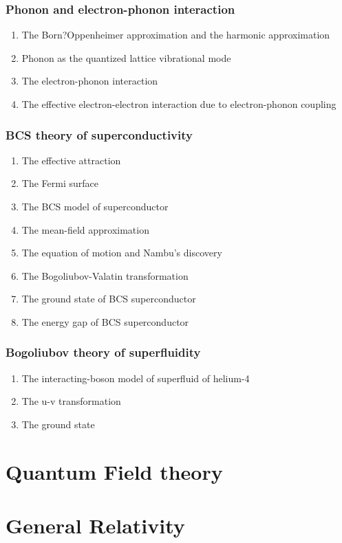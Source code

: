\documentclass[12pt]{article}
\numberwithin{equation}{section}
\begin{document}
\subsubsection{Phonon and electron-phonon interaction}
\begin{enumerate}
\item The Born?Oppenheimer approximation and the harmonic approximation
\item Phonon as the quantized lattice vibrational mode
\item The electron-phonon interaction
\item The effective electron-electron interaction due to electron-phonon coupling
\end{enumerate}
\subsubsection{BCS theory of superconductivity}
\begin{enumerate}
\item The effective attraction
\item The Fermi surface
\item The BCS model of  superconductor
\item The mean-field approximation
\item The equation of motion and Nambu's discovery
\item The Bogoliubov-Valatin transformation
\item The ground state of BCS superconductor
\item The energy gap of BCS superconductor
\end{enumerate}
\subsubsection{Bogoliubov theory of superfluidity}
\begin{enumerate}
\item The interacting-boson model of superfluid of helium-4
\item The u-v transformation
\item The ground state
\end{enumerate}                     
\section{Quantum Field theory}

\section{General Relativity}
\end{document}

